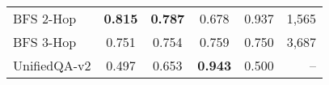 \begin{center}
\begin{tabular}{lccccr}
    \midrule
    BFS 2-Hop & \textbf{0.815} & \textbf{0.787} & 0.678 & 0.937 & 1,565 \\ 
    BFS 3-Hop & 0.751 & 0.754 & 0.759 & 0.750 & 3,687\\ 
    \midrule
    UnifiedQA-v2 & 0.497 & 0.653 & \textbf{0.943} & 0.500 & --\\
    \bottomrule
\end{tabular}
\end{center}

